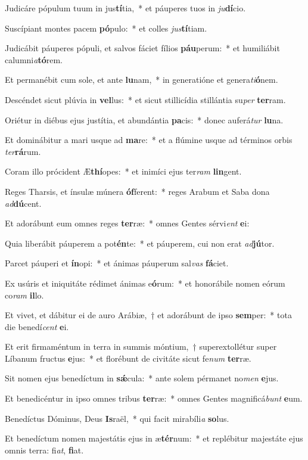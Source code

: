 \item Judicáre pópulum tuum in jus\textbf{tí}tia,~* et páuperes tuos in \textit{ju}\textbf{dí}cio.
\item Suscípiant montes pacem \textbf{pó}pulo:~* et colles \textit{jus}\textbf{tí}tiam.
\item Judicábit páuperes pópuli, et salvos fáciet fílios \textbf{páu}perum:~* et humiliábit calumni\textit{a}\textbf{tó}rem.
\item Et permanébit cum sole, et ante \textbf{lu}nam,~* in generatióne et genera\textit{ti}\textbf{ó}nem.
\item Descéndet sicut plúvia in \textbf{vel}lus:~* et sicut stillicídia stillántia su\textit{per} \textbf{ter}ram.
\item Oriétur in diébus ejus justítia, et abundántia \textbf{pa}cis:~* donec auferá\textit{tur} \textbf{lu}na.
\item Et dominábitur a mari usque ad \textbf{ma}re:~* et a flúmine usque ad términos orbis \textit{ter}\textbf{rá}rum.
\item Coram illo prócident Æ\textbf{thí}opes:~* et inimíci ejus ter\textit{ram} \textbf{lin}gent.
\item Reges Tharsis, et ínsulæ múnera \textbf{óf}ferent:~* reges Arabum et Saba dona \textit{ad}\textbf{dú}cent.
\item Et adorábunt eum omnes reges \textbf{ter}ræ:~* omnes Gentes sérvi\textit{ent} \textbf{e}i:
\item Quia liberábit páuperem a pot\textbf{én}te:~* et páuperem, cui non erat \textit{ad}\textbf{jú}tor.
\item Parcet páuperi et \textbf{ín}opi:~* et ánimas páuperum sal\textit{vas} \textbf{fá}ciet.
\item Ex usúris et iniquitáte rédimet ánimas e\textbf{ó}rum:~* et honorábile nomen eórum co\textit{ram} \textbf{il}lo.
\item Et vivet, et dábitur ei de auro Arábiæ,~† et adorábunt de ipso \textbf{sem}per:~* tota die benedí\textit{cent} \textbf{e}i.
\item Et erit firmaméntum in terra in summis móntium,~† superextollétur super Líbanum fructus \textbf{e}jus:~* et florébunt de civitáte sicut fe\textit{num} \textbf{ter}ræ.
\item Sit nomen ejus benedíctum in \textbf{sǽ}cula:~* ante solem pérmanet no\textit{men} \textbf{e}jus.
\item Et benedicéntur in ipso omnes tribus \textbf{ter}ræ:~* omnes Gentes magnificá\textit{bunt} \textbf{e}um.
\item Benedíctus Dóminus, Deus \textbf{Is}raël,~* qui facit mirabíli\textit{a} \textbf{so}lus.
\item Et benedíctum nomen majestátis ejus in æ\textbf{tér}num:~* et replébitur majestáte ejus omnis terra: fi\textit{at}, \textbf{fi}at.
